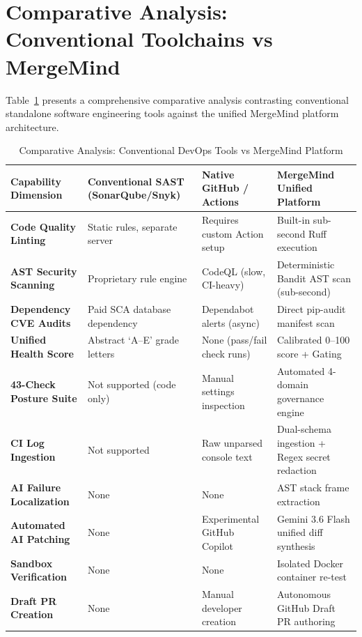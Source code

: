 \section{Comparative Analysis: Conventional Toolchains vs MergeMind}
\label{sec:lit-comparison}

Table~\ref{tab:comparative-analysis} presents a comprehensive comparative analysis contrasting conventional standalone software engineering tools against the unified MergeMind platform architecture.

\begin{table}[htbp]
    \centering
    \caption{Comparative Analysis: Conventional DevOps Tools vs MergeMind Platform}
    \label{tab:comparative-analysis}
    \small
    \begin{tabularx}{\textwidth}{p{} p{} p{} p{}}
        \toprule
        \textbf{Capability Dimension} & \textbf{Conventional SAST (SonarQube/Snyk)} & \textbf{Native GitHub / Actions} & \textbf{MergeMind Unified Platform} \\
        \midrule
        \textbf{Code Quality Linting} & Static rules, separate server & Requires custom Action setup & Built-in sub-second Ruff execution \\
        \addlinespace
        \textbf{AST Security Scanning} & Proprietary rule engine & CodeQL (slow, CI-heavy) & Deterministic Bandit AST scan (sub-second) \\
        \addlinespace
        \textbf{Dependency CVE Audits} & Paid SCA database dependency & Dependabot alerts (async) & Direct pip-audit manifest scan \\
        \addlinespace
        \textbf{Unified Health Score} & Abstract `A--E' grade letters & None (pass/fail check runs) & Calibrated 0--100 score + Gating \\
        \addlinespace
        \textbf{43-Check Posture Suite} & Not supported (code only) & Manual settings inspection & Automated 4-domain governance engine \\
        \addlinespace
        \textbf{CI Log Ingestion} & Not supported & Raw unparsed console text & Dual-schema ingestion + Regex secret redaction \\
        \addlinespace
        \textbf{AI Failure Localization} & None & None & AST stack frame extraction \\
        \addlinespace
        \textbf{Automated AI Patching} & None & Experimental GitHub Copilot & Gemini 3.6 Flash unified diff synthesis \\
        \addlinespace
        \textbf{Sandbox Verification} & None & None & Isolated Docker container re-test \\
        \addlinespace
        \textbf{Draft PR Creation} & None & Manual developer creation & Autonomous GitHub Draft PR authoring \\
        \bottomrule
    \end{tabularx}
\end{table}

